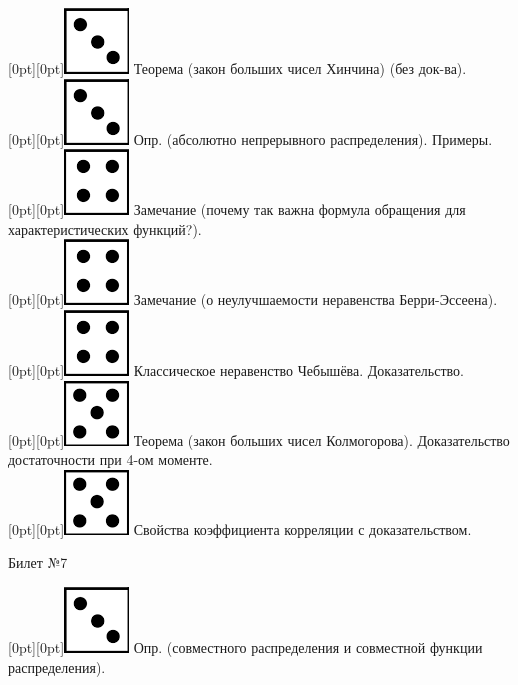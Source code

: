 \documentclass[10pt]{article}
\begin{document}
\raisebox{-1pt}[0pt][0pt]{\includegraphics[width=0.02\linewidth]{3.png}} Теорема (закон больших чисел Хинчина) (без док-ва). \\

\raisebox{-1pt}[0pt][0pt]{\includegraphics[width=0.02\linewidth]{3.png}} Опр. (абсолютно непрерывного распределения). Примеры. \\

\raisebox{-1pt}[0pt][0pt]{\includegraphics[width=0.02\linewidth]{4.png}} Замечание (почему так важна формула обращения для характеристических функций?). \\

\raisebox{-1pt}[0pt][0pt]{\includegraphics[width=0.02\linewidth]{4.png}} Замечание (о неулучшаемости неравенства Берри-Эссеена). \\

\raisebox{-1pt}[0pt][0pt]{\includegraphics[width=0.02\linewidth]{4.png}} Классическое неравенство Чебышёва. Доказательство. \\

\raisebox{-1pt}[0pt][0pt]{\includegraphics[width=0.02\linewidth]{5.png}} Теорема (закон больших чисел Колмогорова). Доказательство достаточности при 4-ом моменте. \\

\raisebox{-1pt}[0pt][0pt]{\includegraphics[width=0.02\linewidth]{5.png}} Свойства коэффициента корреляции с доказательством. \\

\begin{center} {\Large Билет №7} \end{center} 

\raisebox{-1pt}[0pt][0pt]{\includegraphics[width=0.02\linewidth]{3.png}} Опр. (совместного распределения и  совместной функции распределения). \\
\end{document}
